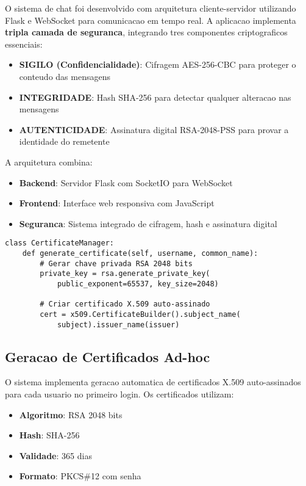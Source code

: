 \documentclass[12pt,a4paper,oneside]{article}
\begin{document}
O sistema de chat foi desenvolvido com arquitetura cliente-servidor utilizando Flask e WebSocket para comunicacao em tempo real. A aplicacao implementa \textbf{tripla camada de seguranca}, integrando tres componentes criptograficos essenciais:

\begin{itemize}
    \item \textbf{SIGILO (Confidencialidade)}: Cifragem AES-256-CBC para proteger o conteudo das mensagens
    \item \textbf{INTEGRIDADE}: Hash SHA-256 para detectar qualquer alteracao nas mensagens
    \item \textbf{AUTENTICIDADE}: Assinatura digital RSA-2048-PSS para provar a identidade do remetente
\end{itemize}

A arquitetura combina:

\begin{itemize}
    \item \textbf{Backend}: Servidor Flask com SocketIO para WebSocket
    \item \textbf{Frontend}: Interface web responsiva com JavaScript
    \item \textbf{Seguranca}: Sistema integrado de cifragem, hash e assinatura digital
\end{itemize}

\begin{lstlisting}[caption=Estrutura da aplicacao de chat]
class CertificateManager:
    def generate_certificate(self, username, common_name):
        # Gerar chave privada RSA 2048 bits
        private_key = rsa.generate_private_key(
            public_exponent=65537, key_size=2048)
        
        # Criar certificado X.509 auto-assinado
        cert = x509.CertificateBuilder().subject_name(
            subject).issuer_name(issuer)
\end{lstlisting}

\subsection{Geracao de Certificados Ad-hoc}

O sistema implementa geracao automatica de certificados X.509 auto-assinados para cada usuario no primeiro login. Os certificados utilizam:

\begin{itemize}
    \item \textbf{Algoritmo}: RSA 2048 bits
    \item \textbf{Hash}: SHA-256
    \item \textbf{Validade}: 365 dias
    \item \textbf{Formato}: PKCS\#12 com senha
\end{itemize}
\end{document}
